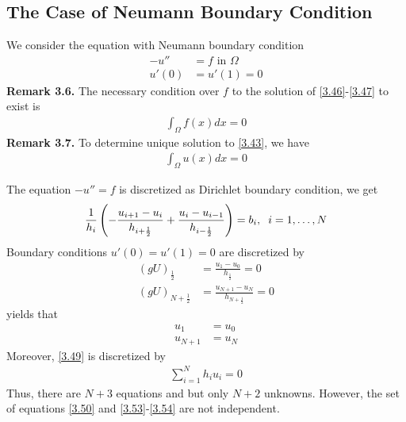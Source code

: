 \documentclass[a4paper]{article}
\numberwithin{equation}{section}
\begin{document}
\subsection{The Case of Neumann Boundary Condition}
We consider the equation with Neumann boundary condition
\begin{align}
\label{3.46}
 - {u''} &= f\mbox{ in } \Omega \\
u'\left( 0 \right) &= u'\left( 1 \right) = 0 \label{3.47}
\end{align}
\textbf{Remark 3.6.} The necessary condition over $f$ to the solution of \eqref{3.46}-\eqref{3.47} to exist is
\begin{align}
\label{3.48}
\int_\Omega  {f\left( x \right)dx}  = 0
\end{align}
\textbf{Remark 3.7.} To determine unique solution to \eqref{3.43}, we have
\begin{align}
\label{3.49}
\int_\Omega  {u\left( x \right)dx}  = 0
\end{align}

The equation $- {u''} = f$ is discretized as Dirichlet boundary condition, we get
\begin{align}
\label{3.50}
\frac{1}{{{h_i}}}\left( { - \frac{{{u_{i + 1}} - {u_i}}}{{{h_{i + \frac{1}{2}}}}} + \frac{{{u_i} - {u_{i - 1}}}}{{{h_{i - \frac{1}{2}}}}}} \right) = {b_i},\hspace{0.2cm} i = 1, \ldots ,N
\end{align}
Boundary conditions $u'\left(0\right)=u'\left(1\right)=0$ are discretized by 
\begin{align}
\label{3.51}
{\left( {gU} \right)_{\frac{1}{2}}} &= \frac{{{u_1} - {u_0}}}{{{h_{\frac{1}{2}}}}} = 0\\
{\left( {gU} \right)_{N + \frac{1}{2}}} &= \frac{{{u_{N + 1}} - {u_N}}}{{{h_{N + \frac{1}{2}}}}} = 0 \label{3.52}
\end{align}
yields that
\begin{align}
\label{3.53}
{u_1} &= {u_0}\\
{u_{N + 1}} &= {u_N} \label{3.54}
\end{align}
Moreover, \eqref{3.49} is discretized by
\begin{align}
\label{3.55}
\sum\limits_{i = 1}^N {{h_i}{u_i}}  = 0
\end{align}
Thus, there are $N+3$ equations and but only $N+2$ unknowns. However, the set of equations \eqref{3.50} and \eqref{3.53}-\eqref{3.54} are not independent.
\end{document}
